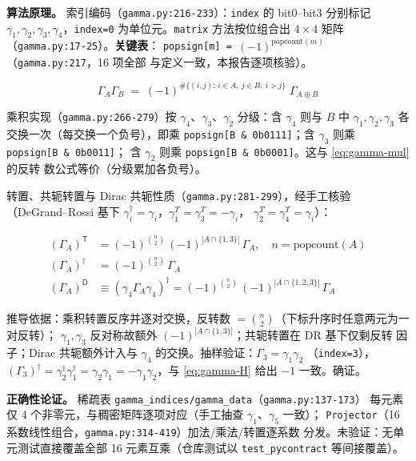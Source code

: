 \documentclass[UTF8]{ctexart}
\begin{document}
\textbf{算法原理。} 索引编码（\texttt{gamma.py:216-233}）：\texttt{index} 的 bit0--bit3
分别标记 $\gamma_1,\gamma_2,\gamma_3,\gamma_4$，\texttt{index=0} 为单位元。\texttt{matrix}
方法按位组合出 $4\times4$ 矩阵（\texttt{gamma.py:17-25}）。\textbf{关键表}：
\texttt{popsign[m] = $(-1)^{\mathrm{popcount}(m)}$}（\texttt{gamma.py:217}，16 项全部
与定义一致，本报告逐项核验）。

\begin{equation}\label{eq:gamma-mul}
\Gamma_A \Gamma_B \;=\; (-1)^{\#\{(i,j):\, i\in A,\ j\in B,\ i>j\}}\; \Gamma_{A\oplus B}
\end{equation}

乘积实现（\texttt{gamma.py:266-279}）按 $\gamma_4$、$\gamma_3$、$\gamma_2$ 分级：含
$\gamma_4$ 则与 $B$ 中 $\gamma_1,\gamma_2,\gamma_3$ 各交换一次（每交换一个负号），即乘
\texttt{popsign[B\,\&\,0b0111]}；含 $\gamma_3$ 则乘 \texttt{popsign[B\,\&\,0b0011]}；
含 $\gamma_2$ 则乘 \texttt{popsign[B\,\&\,0b0001]}。这与 \eqref{eq:gamma-mul} 的反转
数公式等价（分级累加各负号）。

转置、共轭转置与 Dirac 共轭性质（\texttt{gamma.py:281-299}），经手工核验
（DeGrand--Rossi 基下 $\gamma_i^\dagger = \gamma_i$，$\gamma_1^T = \gamma_3^T = -\gamma_i$，
$\gamma_2^T = \gamma_4^T = \gamma_i$）：

\begin{align}
(\Gamma_A)^{\mathsf T} &= (-1)^{\binom{n}{2}} \, (-1)^{|A\cap\{1,3\}|}\,\Gamma_A, \quad n=\mathrm{popcount}(A) \label{eq:gamma-T}\\
(\Gamma_A)^{\dagger} &= (-1)^{\binom{n}{2}}\,\Gamma_A \label{eq:gamma-H}\\
(\Gamma_A)^{\mathsf D} &\equiv (\gamma_4 \Gamma_A \gamma_4)^{\dagger} = (-1)^{\binom{n}{2}} \, (-1)^{|A\cap\{1,2,3\}|}\,\Gamma_A \label{eq:gamma-D}
\end{align}

推导依据：乘积转置反序并逐对交换，反转数 $=\binom{n}{2}$（下标升序时任意两元为一对反转）；
$\gamma_1,\gamma_3$ 反对称故额外 $(-1)^{|A\cap\{1,3\}|}$；共轭转置在 DR 基下仅剩反转
因子；Dirac 共轭额外计入与 $\gamma_4$ 的交换。抽样验证：$\Gamma_3 = \gamma_1\gamma_2$
（\texttt{index=3}），$(\Gamma_3)^\dagger = \gamma_2^\dagger\gamma_1^\dagger = \gamma_2\gamma_1
= -\gamma_1\gamma_2$，与 \eqref{eq:gamma-H} 给出 $-1$ 一致。\textcolor{accent}{确证}。

\textbf{正确性论证。} 稀疏表 \texttt{gamma\_indices/gamma\_data}（\texttt{gamma.py:137-173}）
每元素仅 4 个非零元，与稠密矩阵逐项对应（手工抽查 $\gamma_1$、$\gamma_5$ 一致）；
\texttt{Projector}（16 系数线性组合，\texttt{gamma.py:314-419}）加法/乘法/转置逐系数
分发。\textcolor{warn}{未验证}：无单元测试直接覆盖全部 16 元素互乘（仓库测试以
\texttt{test\_pycontract} 等间接覆盖）。
\end{document}
